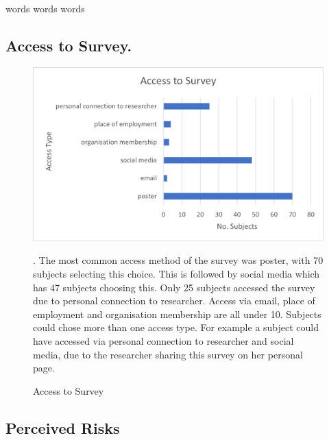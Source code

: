 \paragraph{}
words words words 
\subsection{Access to Survey. }

\begin{figure}[h]
    \centering
    \includegraphics{fig_results/access_survey.png}
    \caption{Access to Survey}. The most common access method of the survey was poster, with 70 subjects selecting this choice. This is followed by social media which has 47 subjects choosing this. Only 25 subjects accessed the survey due to personal connection to researcher. Access via email, place of employment and organisation membership are all under 10. Subjects could chose more than one access type. For example a subject could have accessed via personal connection to researcher and social media, due to the researcher sharing this survey on her personal page.
    \label{fig:my_label}
\end{figure}
\paragraph{}

\subsection{Perceived Risks}

